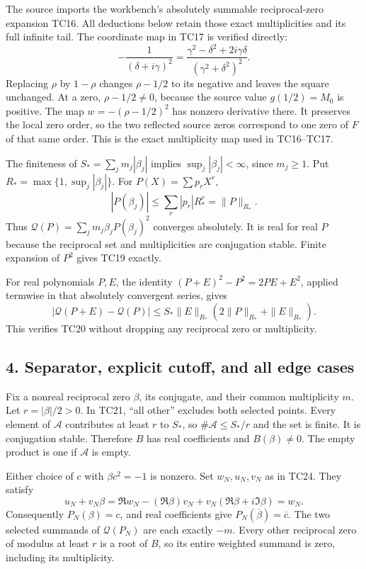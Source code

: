 The source imports the workbench's absolutely summable reciprocal-zero expansion TC16. All deductions below retain those exact multiplicities and its full infinite tail. The coordinate map in TC17 is verified directly: \[
-\frac1{(\delta+i\gamma)^2}
=\frac{\gamma^2-\delta^2+2i\gamma\delta}
{(\gamma^2+\delta^2)^2}.
\tag{TR12}
\] Replacing \(\rho\) by \(1-\rho\) changes \(\rho-1/2\) to its negative and leaves the square unchanged. At a zero, \(\rho-1/2\ne0\), because the source value \(g(1/2)=M_0\) is positive. The map \(w=-(\rho-1/2)^2\) has nonzero derivative there. It preserves the local zero order, so the two reflected source zeros correspond to one zero of \(F\) of that same order. This is the exact multiplicity map used in TC16--TC17.

The finiteness of \(S_*=\sum_jm_j|\beta_j|\) implies \(\sup_j|\beta_j|<\infty\), since \(m_j\ge1\). Put \(R_*=\max\{1,\sup_j|\beta_j|\}\). For \(P(X)=\sum p_rX^r\), \[
|P(\beta_j)|\le\sum_r|p_r|R_*^r=\|P\|_{R_*}.
\tag{TR13}
\] Thus \(\mathcal Q(P)=\sum_jm_j\beta_jP(\beta_j)^2\) converges absolutely. It is real for real \(P\) because the reciprocal set and multiplicities are conjugation stable. Finite expansion of \(P^2\) gives TC19 exactly.

For real polynomials \(P,E\), the identity \((P+E)^2-P^2=2PE+E^2\), applied termwise in that absolutely convergent series, gives \[
|\mathcal Q(P+E)-\mathcal Q(P)|
\le S_*\|E\|_{R_*}(2\|P\|_{R_*}+\|E\|_{R_*}).
\tag{TR14}
\] This verifies TC20 without dropping any reciprocal zero or multiplicity.

\subsection{4. Separator, explicit cutoff, and all edge cases}\label{C47stage:TCReview:separator-explicit-cutoff-and-all-edge-cases}

Fix a nonreal reciprocal zero \(\beta\), its conjugate, and their common multiplicity \(m\). Let \(r=|\beta|/2>0\). In TC21, ``all other'' excludes both selected points. Every element of \(\mathcal A\) contributes at least \(r\) to \(S_*\), so \(\#\mathcal A\le S_*/r\) and the set is finite. It is conjugation stable. Therefore \(B\) has real coefficients and \(B(\beta)\ne0\). The empty product is one if \(\mathcal A\) is empty.

Either choice of \(c\) with \(\beta c^2=-1\) is nonzero. Set \(w_N,u_N,v_N\) as in TC24. They satisfy \[
u_N+v_N\beta
=\Re w_N-(\Re\beta)v_N+v_N(\Re\beta+i\Im\beta)
=w_N.
\tag{TR15}
\] Consequently \(P_N(\beta)=c\), and real coefficients give \(P_N(\overline\beta)=\overline c\). The two selected summands of \(\mathcal Q(P_N)\) are each exactly \(-m\). Every other reciprocal zero of modulus at least \(r\) is a root of \(B\), so its entire weighted summand is zero, including its multiplicity.


